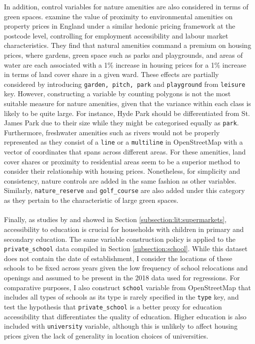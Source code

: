 \documentclass{article}
\begin{document}
In addition, control variables for nature amenities are also considered in terms of green spaces. \citet{Gibbons2014TheApproach} examine the value of proximity to environmental amenities on property prices in England under a similar hedonic pricing framework at the postcode level, controlling for employment accessibility and labour market characteristics. They find that natural amenities command a premium on housing prices, where gardens, green space such as parks and playgrounds, and areas of water are each associated with a 1\% increase in housing prices for a 1\% increase in terms of land cover share in a given ward. These effects are partially considered by introducing \texttt{garden, pitch, park} and \texttt{playground} from \texttt{leisure} key. However, constructing a variable by counting polygons is not the most suitable measure for nature amenities, given that the variance within each class is likely to be quite large. For instance, Hyde Park should be differentiated from St. James Park due to their size while they might be categorised equally as \texttt{park}. Furthermore, freshwater amenities such as rivers would not be properly represented as they consist of a \texttt{line} or a \texttt{multiline} in OpenStreetMap with a vector of coordinates that spans across different areas. For these amenities, land cover shares or proximity to residential areas seem to be a superior method to consider their relationship with housing prices. Nonetheless, for simplicity and consistency, nature controls are added in the same fashion as other variables. Similarly, \texttt{nature\_reserve} and \texttt{golf\_course} are also added under this category as they pertain to the characteristic of large green spaces.\\\\
Finally, as studies by \citet{Niu2016ModelingDemand} and \citet{DepartmentforEducation2017HouseMore} showed in Section \ref{subsection:lit:supermarkets}, accessibility to education is crucial for households with children in primary and secondary education. The same variable construction policy is applied to the \texttt{private\_school} data compiled in Section \ref{subsection:school}. While this dataset does not contain the date of establishment, I consider the locations of these schools to be fixed across years given the low frequency of school relocations and openings and assumed to be present in the 2018 data used for regressions. For comparative purposes, I also construct \texttt{school} variable from OpenStreetMap that includes all types of schools as its type is rarely specified in the \texttt{type} key, and test the hypothesis that \texttt{private\_school} is a better proxy for education accessibility that differentiates the quality of education. Higher education is also included with \texttt{university} variable, although this is unlikely to affect housing prices given the lack of generality in location choices of universities.
\end{document}
